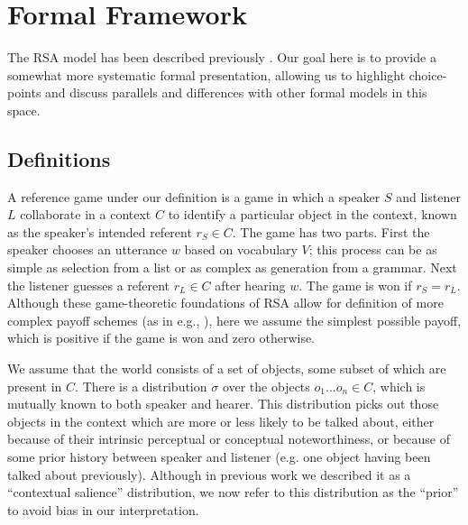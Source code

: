 \documentclass[man,noapacite]{apa2}
\begin{document}
\section{Formal Framework} \label{sec:models-intro}

The RSA model has been described previously \cite{frank2012,goodman2013}. Our goal here is to provide a somewhat more systematic formal presentation, allowing us to highlight choice-points and discuss parallels and differences with other formal models in this space.



\subsection{Definitions}

A reference game under our definition is a game in which a speaker $S$ and listener $L$ collaborate in a context $C$ to identify a particular object in the context, known as the speaker's intended referent $r_S \in C$. The game has two parts. First the speaker chooses an utterance $w$ based on vocabulary $V$; this process can be as simple as selection from a list or as complex as generation from a grammar. Next the listener guesses a referent $r_L \in C$ after hearing $w$. The game is won if $r_S=r_L$. Although these game-theoretic foundations of RSA allow for definition of more complex payoff schemes (as in e.g., ), here we assume the simplest possible payoff, which is positive if the game is won and zero otherwise.

We assume that the world consists of a set of objects, some subset of which are present in $C$. There is a distribution $\sigma$ over the objects ${o_1 ... o_n} \in C$, which is mutually known to both speaker and hearer. This distribution picks out those objects in the context which are more or less likely to be talked about, either because of their intrinsic perceptual or conceptual noteworthiness, or because of some prior history between speaker and listener (e.g. one object having been talked about previously). Although in previous work we described it as a ``contextual salience'' distribution, we now refer to this distribution as the ``prior'' to avoid bias in our interpretation.
\end{document}
